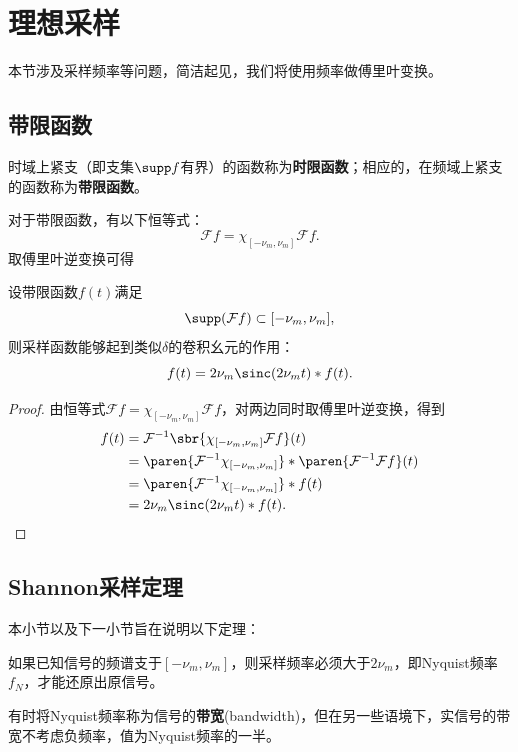 \section{理想采样}\label{sec:Ideal_Sample}

本节涉及采样频率等问题，简洁起见，我们将使用频率做傅里叶变换。

\subsection{带限函数}\label{sub:band_limit}

\begin{definition}[时限函数与带限函数]
    时域上紧支（即支集$\supp f$有界）的函数称为\textbf{时限函数}；相应的，在频域上紧支的函数称为\textbf{带限函数}。
\end{definition}

对于带限函数，有以下恒等式：
\begin{equation}
    \mathcal{F}f=\chi_{[-\nu_m,\nu_m]}\mathcal{F}f.
\end{equation}
取傅里叶逆变换可得
\begin{theorem}
    设带限函数$f(t)$满足
    \begin{equation}
        \supp(\mathcal{F}f)\subset [-\nu_m,\nu_m],
    \end{equation}
    则采样函数能够起到类似$\delta$的卷积幺元的作用：
    \begin{equation}
        f(t)=2\nu_m\sinc(2\nu_m t)*f(t).
    \end{equation}
\end{theorem}
\begin{proof}
    由恒等式$\mathcal{F}f=\chi_{[-\nu_m,\nu_m]}\mathcal{F}f$，对两边同时取傅里叶逆变换，得到
    \begin{align}
        f(t)&=\mathcal{F}^{-1}\sbr{\chi_{[-\nu_m,\nu_m]}\mathcal{F}f}(t)\nonumber\\
        &=\paren{\mathcal{F}^{-1}\chi_{[-\nu_m,\nu_m]}}*\paren{\mathcal{F}^{-1}\mathcal{F}f}(t)\nonumber\\
        &=\paren{\mathcal{F}^{-1}\chi_{[-\nu_m,\nu_m]}}*f(t)\nonumber\\
        &=2\nu_m\sinc(2\nu_m t)*f(t).
    \end{align}
\end{proof}

\subsection{Shannon采样定理}\label{sub:shannon}
本小节以及下一小节旨在说明以下定理：
\begin{theorem}[Shannon采样定理]
    如果已知信号的频谱支于$[-\nu_m,\nu_m]$，则采样频率必须大于$2\nu_m$，即Nyquist频率$f_N$，才能还原出原信号\cite{brad_osgood_ee261}。
\end{theorem}
有时将Nyquist频率称为信号的\textbf{带宽}(bandwidth)，但在另一些语境下，实信号的带宽不考虑负频率，值为Nyquist频率的一半。

